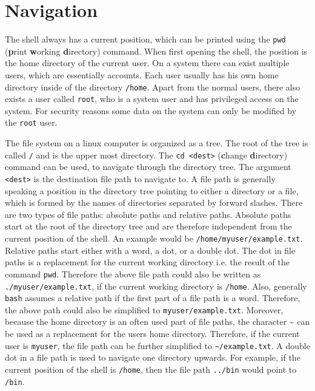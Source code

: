 \section{Navigation}
\label{sec:navigation}

The shell always has a current position, which can be printed using the \lstinline{pwd} (\textbf{p}rint \textbf{w}orking \textbf{d}irectory) command. When first opening the shell, the position is the home directory of the current user. On a system there can exist multiple users, which are essentially accounts. Each user usually has his own home directory inside of the directory \lstinline{/home}. Apart from the normal users, there also exists a user called \lstinline{root}, who is a system user and has privileged access on the system. For security reasons some data on the system can only be modified by the \lstinline{root} user.

The file system on a linux computer is organized as a tree. The root of the tree is called \lstinline{/} and is the upper most directory. The \lstinline{cd <dest>} (\textbf{c}hange \textbf{d}irectory) command can be used, to navigate through the directory tree. The argument \lstinline{<dest>} is the destination file path to navigate to. A file path is generally speaking a position in the directory tree pointing to either a directory or a file, which is formed by the names of directories separated by forward slashes. There are two types of file paths: absolute paths and relative paths. Absolute paths start at the root of the directory tree and are therefore independent from the current position of the shell. An example would be \lstinline{/home/myuser/example.txt}. Relative paths start either with a word, a dot, or a double dot. The dot in file paths is a replacement for the current working directory i.e. the result of the command \lstinline{pwd}. Therefore the above file path could also be written as \lstinline{./myuser/example.txt}, if the current working directory is \lstinline{/home}. Also, generally \lstinline{bash} assumes a relative path if the first part of a file path is a word. Therefore, the above path could also be simplified to \lstinline{myuser/example.txt}. Moreover, because the home directory is an often used part of file paths, the character \textasciitilde{} can be used as a replacement for the users home directory. Therefore, if the current user is \lstinline{myuser}, the file path can be further simplified to \lstinline{~/example.txt}. A double dot in a file path is used to navigate one directory upwards. For example, if the current position of the shell is \lstinline{/home}, then the file path \lstinline{../bin} would point to \lstinline{/bin}.

